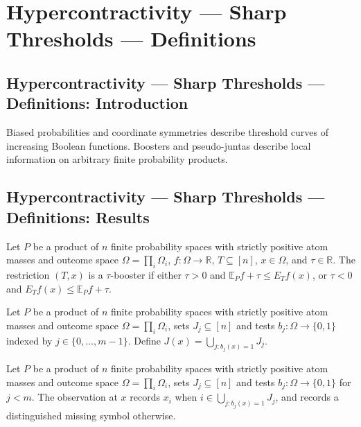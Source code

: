 \section{Hypercontractivity --- Sharp Thresholds --- Definitions}
\subsection*{Hypercontractivity --- Sharp Thresholds --- Definitions: Introduction}
Biased probabilities and coordinate symmetries describe threshold curves of increasing Boolean functions. Boosters and pseudo-juntas describe local information on arbitrary finite probability products.

\subsection*{Hypercontractivity --- Sharp Thresholds --- Definitions: Results}

\begin{definition}
\leanok
{}
Let $P$ be a product of $n$ finite probability spaces with strictly positive atom masses and outcome space $\Omega=\prod_i\Omega_i$, $f:\Omega\to\mathbb R$, $T\subseteq[n]$, $x\in\Omega$, and $\tau\in\mathbb R$. The restriction $(T,x)$ is a $\tau$-booster if either $\tau>0$ and $\mathbb E_Pf+\tau\le E_Tf(x)$, or $\tau<0$ and $E_Tf(x)\le\mathbb E_Pf+\tau$.
\end{definition}

\begin{definition}
\leanok
{}
Let $P$ be a product of $n$ finite probability spaces with strictly positive atom masses and outcome space $\Omega=\prod_i\Omega_i$, sets $J_j\subseteq[n]$ and tests $b_j:\Omega\to\{0,1\}$ indexed by $j\in\{0,\ldots,m-1\}$. Define $J(x)=\bigcup_{j:b_j(x)=1}J_j$.
\end{definition}

\begin{definition}
\leanok
{}
Let $P$ be a product of $n$ finite probability spaces with strictly positive atom masses and outcome space $\Omega=\prod_i\Omega_i$, sets $J_j\subseteq[n]$ and tests $b_j:\Omega\to\{0,1\}$ for $j<m$. The observation at $x$ records $x_i$ when $i\in\bigcup_{j:b_j(x)=1}J_j$, and records a distinguished missing symbol otherwise.
\end{definition}

